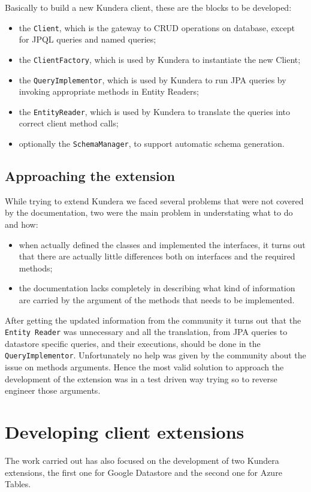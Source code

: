\newparagraph Basically to build a new Kundera client, these are the blocks to be developed:
\begin{itemize}
\item the \texttt{Client}, which is the gateway to CRUD operations on database, except for JPQL queries and named queries;
\item the \texttt{ClientFactory}, which is used by Kundera to instantiate the new Client;
\item the \texttt{QueryImplementor}, which is used by Kundera to run JPA queries by invoking appropriate methods in Entity Readers;
\item the \texttt{EntityReader}, which is used by Kundera to translate the queries into correct client method calls;
\item optionally the \texttt{SchemaManager}, to support automatic schema generation.
\end{itemize}

\subsection{Approaching the extension}
While trying to extend Kundera we faced several problems that were not covered by the documentation, two were the main problem in understating what to do and how:
\begin{itemize}
\item when actually defined the classes and implemented the interfaces, it turns out that there are actually little differences both on interfaces and the required methods; 
\item the documentation lacks completely in describing what kind of information are carried by the argument of the methods that needs to be implemented.
\end{itemize} 

\noindent After getting the updated information from the community it turns out that the \texttt{Entity Reader} was unnecessary and all the translation, from JPA queries to datastore specific queries, and their executions, should be done in the \texttt{QueryImplementor}.  
Unfortunately no help was given by the community about the issue on methods arguments. Hence the most valid solution to approach the development of the extension was in a test driven way trying so to reverse engineer those arguments.

\section{Developing client extensions}
\label{sec:develop}
The work carried out has also focused on the development of two Kundera extensions, the first one for Google Datastore and the second one for Azure Tables.

